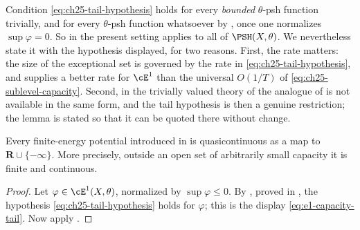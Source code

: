 \begin{remark}
\label{rem:ch25-tail-not-automatic}
Condition \eqref{eq:ch25-tail-hypothesis} holds for every \emph{bounded}
\(\theta\)-psh function trivially, and for every \(\theta\)-psh function
whatsoever by , once one normalizes
\(\sup\varphi=0\).  So in the present setting
 applies to all of
\(\PSH(X,\theta)\).  We nevertheless state it with the hypothesis displayed,
for two reasons.  First, the rate matters: the size of the exceptional set
is governed by the rate in \eqref{eq:ch25-tail-hypothesis}, and
 supplies a better rate for \(\cE^1\) than the
universal \(O(1/T)\) of \eqref{eq:ch25-sublevel-capacity}.  Second, in the
trivially valued theory of  the analogue of
 is not available in the same form, and
the tail hypothesis is then a genuine restriction; the lemma is stated so
that it can be quoted there without change.
\end{remark}

\begin{theorem}
\label{thm:e1-quasicontinuity}
Every finite-energy potential introduced in
 is quasicontinuous as a map to
\(\mathbf R\cup\{-\infty\}\). More precisely, outside an open set of
arbitrarily small capacity it is finite and continuous.
\end{theorem}

\begin{proof}
Let \(\varphi\in\cE^1(X,\theta)\), normalized by \(\sup\varphi\leq0\).  By
, proved in , the
hypothesis \eqref{eq:ch25-tail-hypothesis} holds for \(\varphi\); this is
the display \eqref{eq:e1-capacity-tail}.  Now apply
.
\end{proof}

